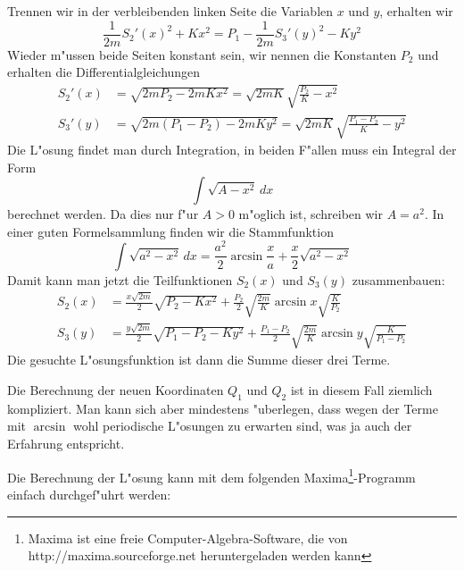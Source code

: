 \begin{loesung}
Trennen wir in der verbleibenden linken Seite die Variablen $x$ und $y$,
erhalten wir
\[
\frac1{2m}S_2'(x)^2+Kx^2
=
P_1-
\frac1{2m}S_3'(y)^2-Ky^2
\]
Wieder m"ussen beide Seiten konstant sein, wir nennen die Konstanten $P_2$
und erhalten die Differentialgleichungen
\begin{align*}
S_2'(x)&=\sqrt{2mP_2-2mKx^2}=\sqrt{2mK}\sqrt{\frac{P_2}{K}-x^2}\\
S_3'(y)&=\sqrt{2m(P_1-P_2)-2mKy^2}=\sqrt{2mK}\sqrt{\frac{P_1-P_2}{K}-y^2}
\end{align*}
Die L"osung findet man durch Integration, in beiden F"allen muss ein 
Integral der Form
\[
\int \sqrt{A-x^2}\,dx
\]
berechnet werden.
Da dies nur f"ur $A>0$ m"oglich ist, schreiben wir $A=a^2$.
In einer guten Formelsammlung finden wir die Stammfunktion
\[
\int\sqrt{a^2-x^2}\,dx
=
\frac{a^2}2\arcsin\frac{x}{a}+\frac{x}2\sqrt{a^2-x^2}
\]
Damit kann man jetzt die Teilfunktionen $S_2(x)$ und $S_3(y)$
zusammenbauen:
\begin{align*}
S_2(x)
&=
\frac{x\sqrt{2m}}2\sqrt{P_2-Kx^2}
+
\frac{P_2}{2}\sqrt{\frac{2m}{K}}\arcsin x\sqrt{\frac{K}{P_2}}
\\
S_3(y)
&=
\frac{y\sqrt{2m}}2\sqrt{P_1-P_2-Ky^2}
+
\frac{P_1-P_2}2 \sqrt{\frac{2m}{K}}\arcsin y\sqrt{\frac{K}{P_1-P_2}}
\end{align*}
Die gesuchte L"osungsfunktion ist dann die Summe dieser drei Terme.
\end{loesung}

\begin{diskussion}
Die Berechnung der neuen Koordinaten $Q_1$ und $Q_2$ ist in diesem
Fall ziemlich kompliziert. Man kann sich aber mindestens "uberlegen,
dass wegen der Terme mit $\arcsin$ wohl periodische L"osungen zu
erwarten sind, was ja auch der Erfahrung entspricht.

Die Berechnung der L"osung kann mit dem folgenden Maxima\footnote{Maxima
ist eine freie Computer-Algebra-Software, die von
http://maxima.sourceforge.net heruntergeladen werden kann}-Programm
einfach durchgef"uhrt werden:
\end{diskussion}
